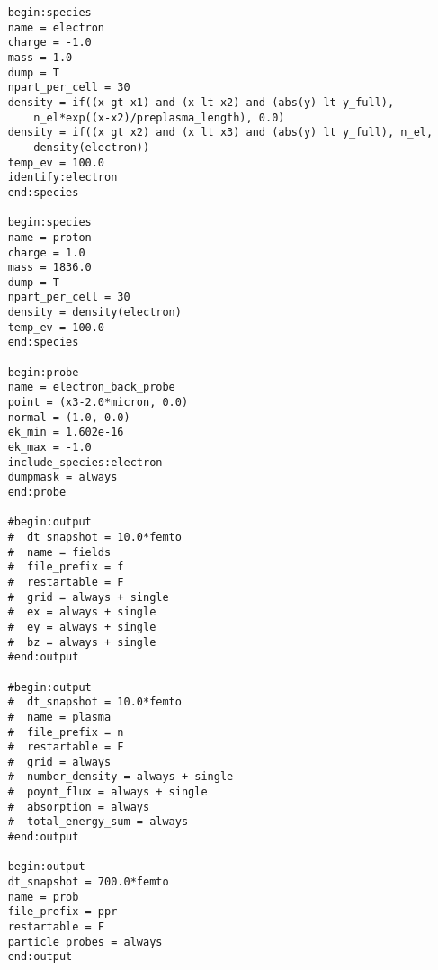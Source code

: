 {\begin{verbatim}
	begin:species
	name = electron
	charge = -1.0
	mass = 1.0
	dump = T
	npart_per_cell = 30 
	density = if((x gt x1) and (x lt x2) and (abs(y) lt y_full),
	    n_el*exp((x-x2)/preplasma_length), 0.0)
	density = if((x gt x2) and (x lt x3) and (abs(y) lt y_full), n_el,
	    density(electron))
	temp_ev = 100.0
	identify:electron
	end:species
	
	begin:species
	name = proton
	charge = 1.0
	mass = 1836.0
	dump = T
	npart_per_cell = 30 
	density = density(electron)
	temp_ev = 100.0
	end:species
	
	begin:probe
	name = electron_back_probe
	point = (x3-2.0*micron, 0.0)
	normal = (1.0, 0.0)
	ek_min = 1.602e-16
	ek_max = -1.0
	include_species:electron
	dumpmask = always
	end:probe
	
	#begin:output
	#  dt_snapshot = 10.0*femto
	#  name = fields
	#  file_prefix = f
	#  restartable = F
	#  grid = always + single
	#  ex = always + single
	#  ey = always + single
	#  bz = always + single
	#end:output
	
	#begin:output
	#  dt_snapshot = 10.0*femto
	#  name = plasma
	#  file_prefix = n
	#  restartable = F
	#  grid = always
	#  number_density = always + single
	#  poynt_flux = always + single
	#  absorption = always
	#  total_energy_sum = always
	#end:output
	
	begin:output
	dt_snapshot = 700.0*femto
	name = prob
	file_prefix = ppr
	restartable = F
	particle_probes = always
	end:output
\end{verbatim}
}